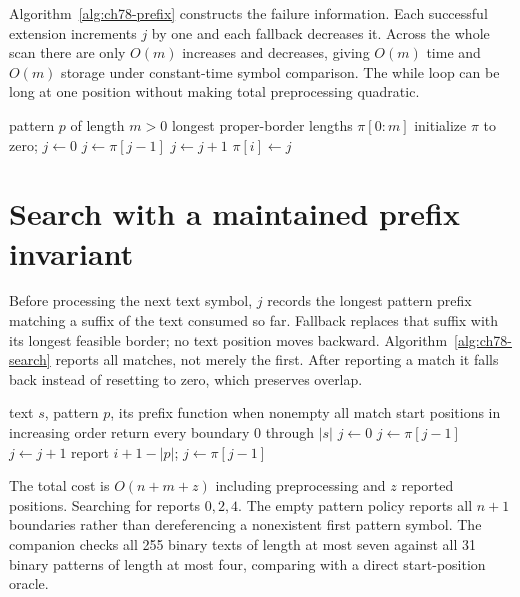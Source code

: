 Algorithm~\ref{alg:ch78-prefix} constructs the failure information.
Each successful extension increments $j$ by one and each fallback decreases it.
Across the whole scan there are only $O(m)$ increases and decreases, giving $O(m)$ time and $O(m)$ storage under constant-time symbol comparison.
The while loop can be long at one position without making total preprocessing quadratic.

\begin{algorithm}[htbp]
\caption{Construct the prefix function of a nonempty pattern.}
\label{alg:ch78-prefix}
\begin{pseudocode}
\Require pattern $p$ of length $m>0$
\Ensure longest proper-border lengths $\pi[0:m]$
\State initialize $\pi$ to zero; $j\gets0$
\State $j\gets\pi[j-1]$
\EndWhile
{} \State $j\gets j+1$ \EndIf
\State $\pi[i]\gets j$
\EndFor
\end{pseudocode}
\end{algorithm}

\section{Search with a maintained prefix invariant}
\label{sec:ch78-search}
Before processing the next text symbol, $j$ records the longest pattern prefix matching a suffix of the text consumed so far.
Fallback replaces that suffix with its longest feasible border; no text position moves backward.
Algorithm~\ref{alg:ch78-search} reports all matches, not merely the first.
After reporting a match it falls back instead of resetting to zero, which preserves overlap.

\begin{algorithm}[htbp]
\caption{Find every exact match, including overlapping matches.}
\label{alg:ch78-search}
\begin{pseudocode}
\Require text $s$, pattern $p$, its prefix function when nonempty
\Ensure all match start positions in increasing order
 \State return every boundary $0$ through $|s|$ \EndIf
\State $j\gets0$
 \State $j\gets\pi[j-1]$ \EndWhile
{} \State $j\gets j+1$ \EndIf
{}
\State report $i+1-|p|$; $j\gets\pi[j-1]$
\EndIf
\EndFor
\end{pseudocode}
\end{algorithm}

The total cost is $O(n+m+z)$ including preprocessing and $z$ reported positions.
Searching  for  reports $0,2,4$.
The empty pattern policy reports all $n+1$ boundaries rather than dereferencing a nonexistent first pattern symbol.
The companion checks all 255 binary texts of length at most seven against all 31 binary patterns of length at most four, comparing with a direct start-position oracle.

